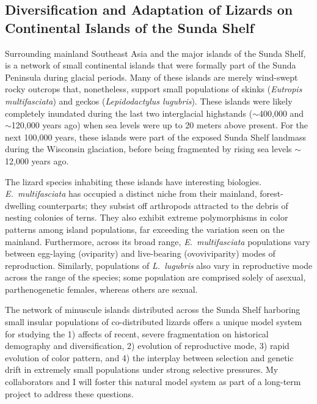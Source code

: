 \subsection*{Diversification and Adaptation of Lizards on Continental Islands
of the Sunda Shelf}
Surrounding mainland Southeast Asia and the major islands of the Sunda Shelf,
is a network of small continental islands that were formally part of the Sunda
Peninsula during glacial periods.
Many of these islands are merely wind-swept rocky outcrops that, nonetheless,
support small populations of skinks (\emph{Eutropis multifasciata}) and geckos
(\emph{Lepidodactylus lugubris}).
These islands were likely completely inundated during the last two
interglacial highstands ($\sim$400,000 and $\sim$120,000 years ago) when sea
levels were up to 20 meters above present.
For the next 100,000 years, these islands were part of the exposed Sunda Shelf
landmass during the Wisconsin glaciation, before being fragmented by rising sea
levels $\sim$12,000 years ago.

The lizard species inhabiting these islands have interesting biologies.
\emph{E.\ multifasciata} has occupied a distinct niche from their mainland,
forest-dwelling counterparts; they subsist off arthropods attracted to the
debris of nesting colonies of terns.
They also exhibit extreme polymorphisms in color patterns among island
populations, far exceeding the variation seen on the mainland.
Furthermore, across its broad range, \emph{E.\ multifasciata} populations vary
between egg-laying (oviparity) and live-bearing (ovoviviparity) modes of
reproduction.
Similarly, populations of \emph{L.\ lugubris} also vary in reproductive mode
across the range of the species; some population are comprised solely of
asexual, parthenogenetic females, whereas others are sexual.

The network of minuscule islands distributed across the Sunda Shelf harboring
small insular populations of co-distributed lizards offers a unique model
system for studying the 
1) affects of recent, severe fragmentation on historical demography and
diversification,
2) evolution of reproductive mode,
3) rapid evolution of color pattern, and 
4) the interplay between selection and genetic drift in extremely small
populations under strong selective pressures.
My collaborators and I will foster this natural model system as part of a
long-term project to address these questions.

